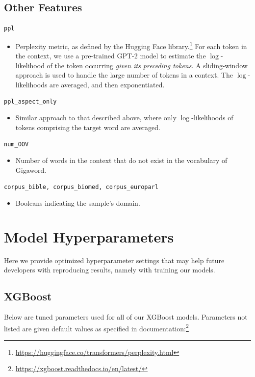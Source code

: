 \documentclass[11pt,a4paper]{article}
\begin{document}
\subsection{Other Features}

\texttt{ppl}
\begin{itemize}
  \item Perplexity metric, as defined by the Hugging Face library.\footnote{\url{https://huggingface.co/transformers/perplexity.html}} For each token in the context, we use a pre-trained GPT-2 model to estimate the $\log$-likelihood of the token occurring \textit{given its preceding tokens}. A sliding-window approach is used to handle the large number of tokens in a context. The $\log$-likelihoods are averaged, and then exponentiated.
\end{itemize}
\texttt{ppl\_aspect\_only}
\begin{itemize}
  \item Similar approach to that described above, where only $\log$-likelihoods of tokens comprising the target word are averaged.
\end{itemize}
\texttt{num\_OOV}
\begin{itemize}
  \item Number of words in the context that do not exist in the vocabulary of Gigaword.
\end{itemize}
\texttt{corpus\_bible, corpus\_biomed, corpus\_europarl}
\begin{itemize}
  \item Booleans indicating the sample's domain.
\end{itemize}

\section{Model Hyperparameters}
\label{appendix:hyperparameters}

Here we provide optimized hyperparameter settings that may help future developers with reproducing results, namely with training our models.

\subsection{XGBoost}

Below are tuned parameters used for all of our XGBoost models. Parameters not listed are given default values as specified in documentation:\footnote{\url{https://xgboost.readthedocs.io/en/latest/}}
\end{document}

